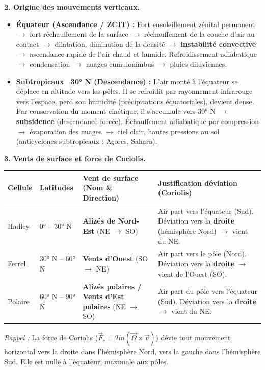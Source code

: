\documentclass[11pt]{article}
\begin{document}
\begin{exoresolu}
\textbf{2. Origine des mouvements verticaux.}
\begin{itemize}
    \item \textbf{Équateur (Ascendance / ZCIT) :} Fort ensoleillement zénital permanent $\to$ fort réchauffement de la surface $\to$ réchauffement de la couche d'air au contact $\to$ dilatation, diminution de la densité $\to$ \textbf{instabilité convective} $\to$ ascendance rapide de l'air chaud et humide. Refroidissement adiabatique $\to$ condensation $\to$ nuages cumulonimbus $\to$ pluies diluviennes.
    \item \textbf{Subtropicaux ~30° N (Descendance) :} L'air monté à l'équateur se déplace en altitude vers les pôles. Il se refroidit par rayonnement infrarouge vers l'espace, perd son humidité (précipitations équatoriales), devient dense. Par conservation du moment cinétique, il s'accumule vers 30° N $\to$ \textbf{subsidence} (descendance forcée). Échauffement adiabatique par compression $\to$ évaporation des nuages $\to$ ciel clair, hautes pressions au sol (anticyclones subtropicaux : Açores, Sahara).
\end{itemize}

\textbf{3. Vents de surface et force de Coriolis.}
\begin{center}
\begin{tabularx}{\linewidth}{|l|X|X|X|}\hline
\textbf{Cellule} & \textbf{Latitudes} & \textbf{Vent de surface (Nom \& Direction)} & \textbf{Justification déviation (Coriolis)} \\ \hline
Hadley & 0° -- 30° N & \textbf{Alizés de Nord-Est} (NE $\to$ SO) & Air part vers l'équateur (Sud). Déviation vers la \textbf{droite} (hémisphère Nord) $\to$ vient du NE. \\ \hline
Ferrel & 30° N -- 60° N & \textbf{Vents d'Ouest} (SO $\to$ NE) & Air part vers le pôle (Nord). Déviation vers la \textbf{droite} $\to$ vient de l'Ouest (SO). \\ \hline
Polaire & 60° N -- 90° N & \textbf{Alizés polaires / Vents d'Est polaires} (NE $\to$ SO) & Air part du pôle vers l'équateur (Sud). Déviation vers la \textbf{droite} $\to$ vient du NE. \\ \hline
\end{tabularx}
\end{center}
\emph{Rappel :} La force de Coriolis ($ \vec{F}_c = 2m(\vec{\Omega} \times \vec{v}) $) dévie tout mouvement horizontal vers la droite dans l'hémisphère Nord, vers la gauche dans l'hémisphère Sud. Elle est nulle à l'équateur, maximale aux pôles.


\end{exoresolu}
\end{document}
